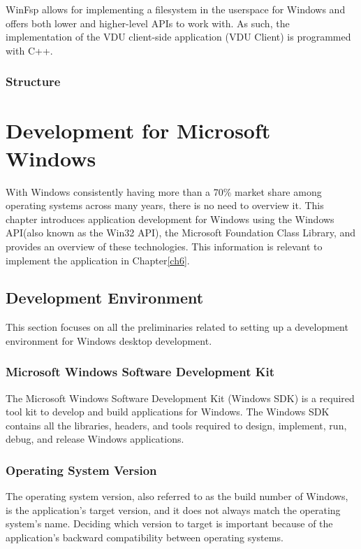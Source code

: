 WinFsp\cite{WinFsp} allows for implementing a filesystem in the userspace for Windows and offers both lower and higher-level APIs to work with. As such, the implementation of the VDU client-side application (VDU Client) is programmed with C++. 

\subsection*{Structure}

\chapter{Development for Microsoft Windows}
\label{ch2}

With Windows consistently having more than a 70\% market share among operating systems across many years\cite{DesktopOSStats}, there is no need to overview it. This chapter introduces application development for Windows using the Windows API(also known as the Win32 API), the Microsoft Foundation Class Library, and provides an overview of these technologies. This information is relevant to implement the application in Chapter\ref{ch6}.

\section{Development Environment}
This section focuses on all the preliminaries related to setting up a development environment for Windows desktop development.

\subsection*{Microsoft Windows Software Development Kit}
The Microsoft Windows Software Development Kit (Windows SDK) is a required tool kit to develop and build applications for Windows. The Windows SDK contains all the libraries, headers, and tools required to design, implement, run, debug, and release Windows applications.

\subsection*{Operating System Version}
The operating system version, also referred to as the build number of Windows, is the application's target version, and it does not always match the operating system's name. Deciding which version to target is important because of the application's backward compatibility between operating systems.\cite{OsVersion} 


